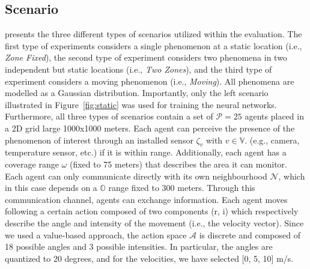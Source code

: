 \subsection{Scenario}
 presents the three different types of scenarios utilized within the evaluation. The first type of experiments considers a single phenomenon at a static location (i.e., \emph{Zone Fixed}), the second type of experiment considers two phenomena in two independent but static locations (i.e., \emph{Two Zones}), and the third type of experiment considers a moving phenomenon (i.e., \emph{Moving}). All phenomena are modelled as a Gaussian distribution. Importantly, only the left scenario illustrated in Figure~\ref{fig:static} was used for training the neural networks. 
Furthermore, all three types of scenarios contain a set of $\mathcal{P} = 25$ agents placed in a 2D grid large 1000x1000 meters. %
Each agent can perceive the presence
 of the phenomenon of interest through an installed sensor $\zeta_v$ with $v \in \mathbb{V}$. 
 (e.g., camera, temperature sensor, etc.) if it is within range.
%
Additionally, each agent has a coverage range $\omega$ (fixed to 75 meters) 
 that describes the area it can monitor. 
 Each agent can only communicate directly with its own neighbourhood $\mathcal{N}$, 
 which in this case depends on a $\mathbb{O}$ range fixed to 300 meters. %
Through this communication channel, agents can exchange information. 
%
Each agent moves following a certain action composed of two components (r, i) 
 which respectively describe the angle and intensity of the movement (i.e., the velocity vector).
Since we used a value-based approach, 
 the action space $\mathcal{A}$ is discrete and composed of 18 possible angles and 3 possible intensities.
In particular, the angles are quantized to 20 degrees, and for the velocities, we have selected [0, 5, 10] m/s.
%

